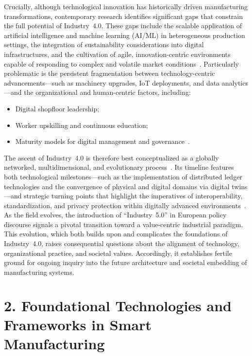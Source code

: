 \documentclass[11pt]{article}
\begin{document}
Crucially, although technological innovation has historically driven manufacturing transformations, contemporary research identifies significant gaps that constrain the full potential of Industry~4.0. These gaps include the scalable application of artificial intelligence and machine learning (AI/ML) in heterogeneous production settings, the integration of sustainability considerations into digital infrastructures, and the cultivation of agile, innovation-centric environments capable of responding to complex and volatile market conditions~\cite{ref41,ref63,ref86}. Particularly problematic is the persistent fragmentation between technology-centric advancements—such as machinery upgrades, IoT deployments, and data analytics—and the organizational and human-centric factors, including:

\begin{itemize}
    \item Digital shopfloor leadership;
    \item Worker upskilling and continuous education;
    \item Maturity models for digital management and governance~\cite{ref92}.
\end{itemize}

The ascent of Industry~4.0 is therefore best conceptualized as a globally networked, multidimensional, and evolutionary process~\cite{ref24}. Its timeline features both technological milestones—such as the implementation of distributed ledger technologies and the convergence of physical and digital domains via digital twins—and strategic turning points that highlight the imperatives of interoperability, standardization, and privacy protection within digitally advanced environments~\cite{ref67,ref91}. As the field evolves, the introduction of ``Industry~5.0'' in European policy discourse signals a pivotal transition toward a value-centric industrial paradigm. This evolution, which both builds upon and complicates the foundations of Industry~4.0, raises consequential questions about the alignment of technology, organizational practice, and societal values. Accordingly, it establishes fertile ground for ongoing inquiry into the future architecture and societal embedding of manufacturing systems.


\section{2. Foundational Technologies and Frameworks in Smart Manufacturing}
\end{document}

